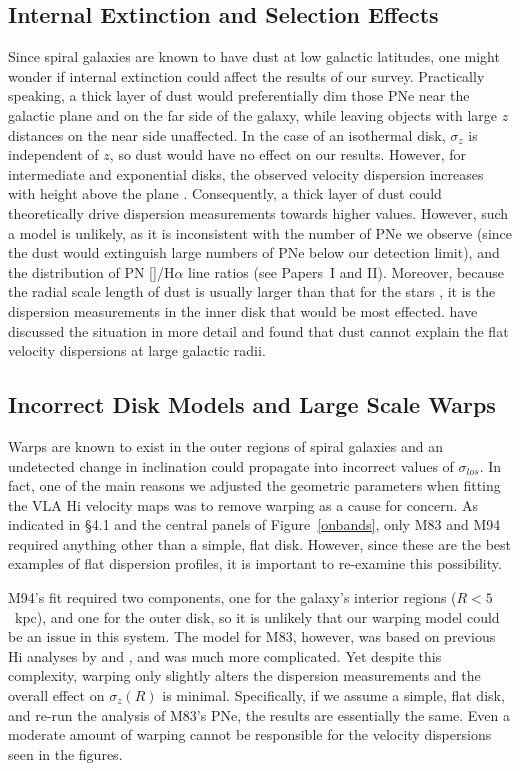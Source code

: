 \documentclass[12pt,preprint]{emulateapj}
\begin{document}
\subsection{Internal Extinction and Selection Effects}
Since spiral galaxies are known to have dust at low galactic latitudes, one might wonder if internal extinction could affect the results of our survey.  Practically speaking, a thick layer of dust would preferentially dim those PNe near the galactic plane and on the far side of the galaxy, while leaving objects with large $z$ distances on the near side unaffected.  In the case of an isothermal disk, $\sigma_z$ is independent of $z$, so dust would have no effect on our results.  However, for intermediate and exponential disks, the observed velocity dispersion increases with height above the plane \citep{vdK88}.  Consequently, a thick layer of dust could theoretically drive dispersion measurements towards higher values.  However, such a model is unlikely, as it is inconsistent with the number of PNe we observe (since the dust would extinguish large numbers of PNe below our detection limit), and the distribution of PN []/H$\alpha$ line ratios (see Papers~I and II).  Moreover, because the radial scale length of dust is usually larger than that for the stars \citep[][]{bianchi}, it is the dispersion measurements in the inner disk that would be most effected. \citet{M33PNe} have discussed the situation in more detail and found that dust cannot explain the flat velocity dispersions at large galactic radii.

\subsection{Incorrect Disk Models and Large Scale Warps}
Warps are known to exist in the outer regions of spiral galaxies and an undetected change in inclination could propagate into incorrect values of $\sigma_{los}$.  In fact, one of the main reasons we adjusted the geometric parameters when fitting the VLA H{\sc i} velocity maps was to remove warping as a cause for concern.  As indicated in \S4.1 and the central panels of Figure~\ref{onbands}, only M83 and M94 required anything other than a simple, flat disk.  However, since these are the best examples of flat dispersion profiles, it is important to re-examine this possibility.

M94's fit required two components, one for the galaxy's interior regions ($R < 5$~kpc), and one for the outer disk, so it is unlikely that our warping model could be an issue in this system.  The model for M83, however, was based on previous H{\sc i} analyses by \citet{M83HI} and \citet{p+01}, and was much more complicated.  Yet despite this complexity, warping only slightly alters the dispersion measurements and the overall effect on $\sigma_z(R)$ is minimal.  Specifically, if we assume a simple, flat disk, and re-run the analysis of M83's PNe, the results are essentially the same.  Even a moderate amount of warping cannot be responsible for the velocity dispersions seen in the figures.
\end{document}
